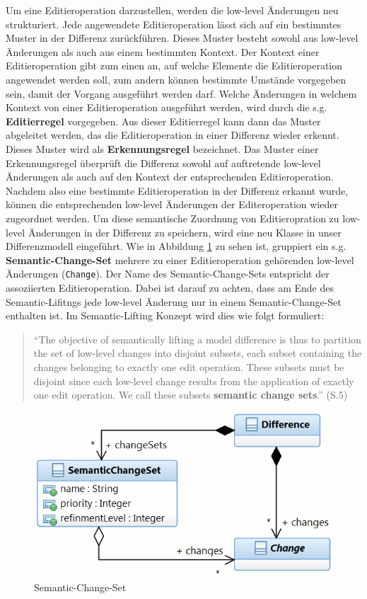 Um eine Editieroperation darzustellen, werden die low-level Änderungen neu strukturiert. Jede
angewendete Editieroperation lässt sich auf ein bestimmtes Muster in der Differenz zurückführen.
Dieses Muster besteht sowohl aus low-level Änderungen als auch aus einem bestimmten Kontext. Der
Kontext einer Editieroperation gibt zum einen an, auf welche Elemente die Editieroperation
angewendet werden soll, zum andern können bestimmte Umstände vorgegeben sein, damit der Vorgang
ausgeführt werden darf. Welche Änderungen in welchem Kontext von einer Editieroperation ausgeführt werden, wird
durch die s.g. \textbf{Editierregel} vorgegeben. Aus dieser Editierregel kann dann das Muster
abgeleitet werden, das die Editieroperation in einer Differenz wieder erkennt. Dieses Muster wird
als \textbf{Erkennungsregel} bezeichnet. Das Muster einer Erkennungsregel überprüft die Differenz sowohl
auf auftretende low-level Änderungen als auch auf den Kontext der entsprechenden Editieroperation.
Nachdem also eine bestimmte Editieroperation in der Differenz erkannt wurde, können die
entsprechenden low-level Änderungen der Editeroperation wieder zugeordnet werden. Um diese
semantische Zuordnung von Editieropration zu low-level Änderungen in der Differenz zu speichern,
wird eine neu Klasse in unser Differenzmodell eingeführt. Wie in Abbildung \ref{fig:scs} zu sehen
ist, gruppiert ein s.g. \textbf{Semantic-Change-Set} mehrere zu einer Editieroperation gehörenden
low-level Änderungen (\texttt{Change}). Der Name des Semantic-Change-Sets entspricht der
assoziierten Editieroperation. Dabei ist darauf zu achten, dass am Ende des Semantic-Lifitngs jede
low-level Änderung nur in einem Semantic-Change-Set enthalten ist. Im Semantic-Lifting Konzept  wird
dies wie folgt formuliert:
\begin{quote}
"`The objective of semantically lifting a model difference is thus to partition the set of low-level
changes into disjoint subsets, each subset containing the changes belonging to exactly one edit
operation. These subsets must be disjoint since each low-level change results from the application
of exactly one edit operation. We call these subsets \textbf{semantic change sets}."'
\cite{KeKT2011ASE} (S.5)
\end{quote}

\begin{figure}[htb]
  \centering
  \includegraphics[scale=0.5]{images/semantic_change_set.png}
  \caption{Semantic-Change-Set}
  \label{fig:scs}
\end{figure}